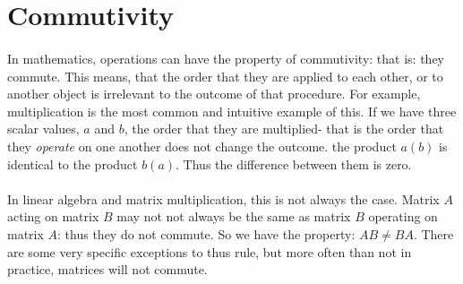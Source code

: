 \documentclass[12pt,letterpaper]{book}
\begin{document}

\section{Commutivity}
\paragraph*{}In mathematics, operations can have the property of commutivity: that is: they commute. This means, that the order that they are applied to each other, or to another object is irrelevant to the outcome of that procedure. For example, multiplication is the most common and intuitive example of this. If we have three scalar values, $a$ and $b$, the order that they are multiplied- that is the order that they \textit{operate} on one another does not change the outcome. the product $a(b)$ is identical to the product $b(a)$. Thus the difference between them is zero.
\paragraph*{}In linear algebra and matrix multiplication, this is not always the case. Matrix $A$ acting on matrix $B$ may not not always be the same as matrix $B$ operating on matrix $A$: thus they do not commute. So we have the property: $AB \neq BA$. There are some very specific exceptions to thus rule, but more often than not in practice, matrices will not commute.
\end{document}
